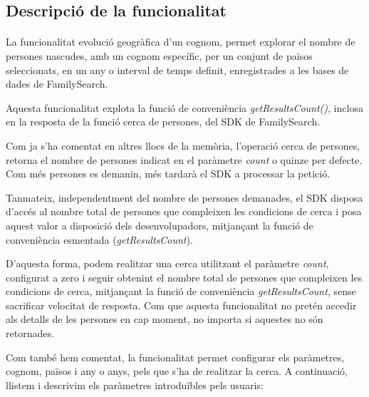 \subsection{Descripció de la funcionalitat}

    \paragraph{}
    La funcionalitat evolució geogràfica d'un cognom, permet explorar el nombre de persones nascudes, amb un cognom específic, per un conjunt de països seleccionats, en un any o interval de temps definit, enregistrades a les bases de dades de FamilySearch.

    Aquesta funcionalitat explota la funció de conveniència \emph{getResultsCount()}, inclosa en la resposta de la funció cerca de persones, del SDK de FamilySearch.

    Com ja s'ha comentat en altres llocs de la memòria, l'operació cerca de persones, retorna el nombre de persones indicat en el paràmetre \emph{count} o quinze per defecte. Com més persones es demanin, més tardarà el SDK a processar la petició.

    Tanmateix, independentment del nombre de persones demanades, el SDK disposa d’accés al nombre total de persones que compleixen les condicions de cerca i posa aquest valor a disposició dels desenvolupadors, mitjançant la funció de conveniència esmentada (\emph{getResultsCount}).

    D'aquesta forma, podem realitzar una cerca utilitzant el paràmetre \emph{count}, con\-fi\-gu\-rat a zero i seguir obtenint el nombre total de persones que compleixen les condicions de cerca, mitjançant la funció de conveniència \emph{getResultsCount}, sense sacrificar velocitat de resposta. Com que aquesta funcionalitat no pretén accedir als detalls de les persones en cap moment, no importa si aquestes no són retornades.

    Com també hem comentat, la funcionalitat permet configurar els paràmetres, cognom, països i any o anys, pels que s'ha de realitzar la cerca. A continuació, llistem i descrivim els paràmetres introduïbles pels usuaris:

